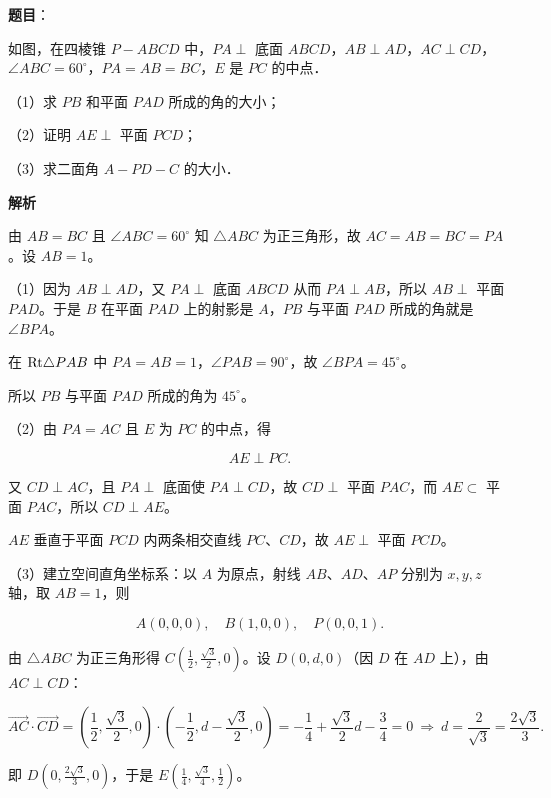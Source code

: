 \begin{answer}

\textbf{题目}：

如图，在四棱锥 $P-ABCD$ 中，$PA\perp$ 底面 $ABCD$，$AB\perp AD$，$AC\perp CD$，$\angle ABC=60^\circ$，$PA=AB=BC$，$E$ 是 $PC$ 的中点．

（1）求 $PB$ 和平面 $PAD$ 所成的角的大小；

（2）证明 $AE\perp$ 平面 $PCD$；

（3）求二面角 $A-PD-C$ 的大小．
\nopagebreak[4]
\begin{center}\end{center}
\nopagebreak[4]
\textbf{解析}

由 $AB=BC$ 且 $\angle ABC=60^\circ$ 知 $\triangle ABC$ 为正三角形，故 $AC=AB=BC=PA$。设 $AB=1$。

（1）因为 $AB\perp AD$，又 $PA\perp$ 底面 $ABCD$ 从而 $PA\perp AB$，所以 $AB\perp$ 平面 $PAD$。于是 $B$ 在平面 $PAD$ 上的射影是 $A$，$PB$ 与平面 $PAD$ 所成的角就是 $\angle BPA$。

在 ${\rm Rt}\triangle PAB$ 中 $PA=AB=1$，$\angle PAB=90^\circ$，故 $\angle BPA=45^\circ$。

所以 $PB$ 与平面 $PAD$ 所成的角为 $45^\circ$。

（2）由 $PA=AC$ 且 $E$ 为 $PC$ 的中点，得

\nopagebreak[4]
\[AE\perp PC .\]

又 $CD\perp AC$，且 $PA\perp$ 底面使 $PA\perp CD$，故 $CD\perp$ 平面 $PAC$，而 $AE\subset$ 平面 $PAC$，所以 $CD\perp AE$。

$AE$ 垂直于平面 $PCD$ 内两条相交直线 $PC$、$CD$，故 $AE\perp$ 平面 $PCD$。

（3）建立空间直角坐标系：以 $A$ 为原点，射线 $AB$、$AD$、$AP$ 分别为 $x,y,z$ 轴，取 $AB=1$，则

\nopagebreak[4]
\[A(0,0,0),\quad B(1,0,0),\quad P(0,0,1).\]

由 $\triangle ABC$ 为正三角形得 $C\left(\frac12,\frac{\sqrt3}2,0\right)$。设 $D(0,d,0)$（因 $D$ 在 $AD$ 上），由 $AC\perp CD$：

\nopagebreak[4]
\[\overrightarrow{AC}\cdot\overrightarrow{CD}=\left(\frac12,\frac{\sqrt3}2,0\right)\cdot\left(-\frac12,d-\frac{\sqrt3}2,0\right)=-\frac14+\frac{\sqrt3}2d-\frac34=0\ \Longrightarrow\ d=\frac{2}{\sqrt3}=\frac{2\sqrt3}3 .\]

即 $D\left(0,\frac{2\sqrt3}3,0\right)$，于是 $E\left(\frac14,\frac{\sqrt3}4,\frac12\right)$。


\end{answer}
